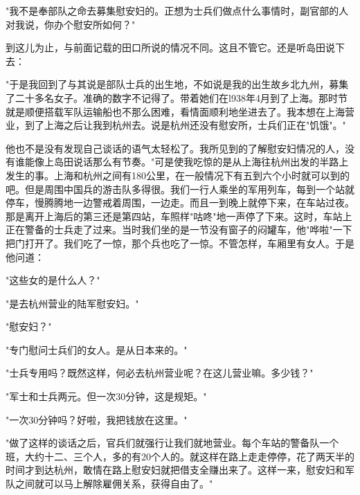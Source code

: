 \documentclass[12pt,UTF8]{ctexbook}
\begin{document}
"我不是奉部队之命去募集慰安妇的。正想为士兵们做点什么事情时，副官部的人对我说，你办个慰安所如何？"



到这儿为止，与前面记载的田口所说的情况不同。这且不管它。还是听岛田说下去：



"于是我回到了与其说是部队士兵的出生地，不如说是我的出生故乡北九州，募集了二十多名女子。准确的数字不记得了。带着她们在l938年4月到了上海。那时节就是顺便搭载军队运输船也不那么困难，看情面顺利地坐进去了。我本想在上海营业，到了上海之后让我到杭州去。说是杭州还没有慰安所，士兵们正在"饥饿"。"



他也不是没有发现自己谈话的语气太轻松了。我所见到的了解慰安妇情况的人，没有谁能像上岛田说话那么有节奏。"可是使我吃惊的是从上海往杭州出发的半路上发生的事。上海和杭州之间有180公里，在一般情况下有五到六个小时就可以到的吧。但是周围中国兵的游击队多得很。我们一行人乘坐的军用列车，每到一个站就停车，慢腾腾地一边警戒着周围，一边走。而且一到晚上就停下来，在车站过夜。那是离开上海后的第三还是第四站，车照样"咕咚"地一声停了下来。这时，车站上正在警备的士兵走了过来。当时我们坐的是一节没有窗子的闷罐车，他"哗啦"一下把门打开了。我们吃了一惊，那个兵也吃了一惊。不管怎样，车厢里有女人。于是他问道：



"这些女的是什么人？"



"是去杭州营业的陆军慰安妇。"



"慰安妇？"



"专门慰问士兵们的女人。是从日本来的。"



"士兵专用吗？既然这样，何必去杭州营业呢？在这儿营业嘛。多少钱？"



"军士和士兵两元。但一次30分钟，这是规矩。"



"一次30分钟吗？好啦，我把钱放在这里。"



"做了这样的谈话之后，官兵们就强行让我们就地营业。每个车站的警备队一个班，大约十二、三个人，多的有20个人的。就这样在路上走走停停，花了两天半的时间才到达杭州，敢情在路上慰安妇就把借支全赚出来了。这样一来，慰安妇和军队之间就可以马上解除雇佣关系，获得自由了。"
\end{document}
